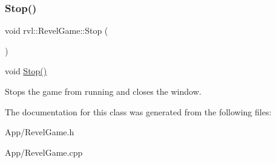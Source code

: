 \subsubsection{\texorpdfstring{Stop()}{Stop()}}
{\footnotesize\ttfamily void rvl\+::\+Revel\+Game\+::\+Stop (\begin{DoxyParamCaption}{ }\end{DoxyParamCaption})}



void \hyperlink{classrvl_1_1_revel_game_ae2e535afe54176e266c1ec25ad11f9bc}{Stop()} 

Stops the game from running and closes the window. 

The documentation for this class was generated from the following files\+:\begin{DoxyCompactItemize}
\item 
App/Revel\+Game.\+h\item 
App/Revel\+Game.\+cpp\end{DoxyCompactItemize}

